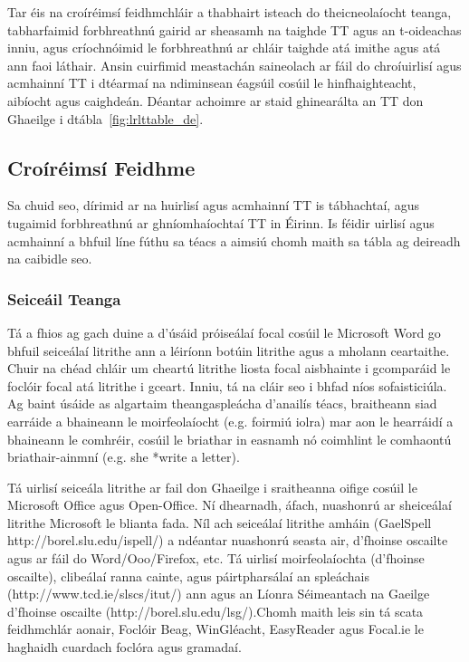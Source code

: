 \begin{multicols}{2}
Tar éis na croíréimsí feidhmchláir a thabhairt isteach do theicneolaíocht teanga, tabharfaimid forbhreathnú gairid ar sheasamh na taighde TT agus an t-oideachas inniu, agus críochnóimid le forbhreathnú ar chláir taighde atá imithe agus atá ann faoi láthair. Ansin cuirfimid meastachán saineolach ar fáil do chroíuirlisí agus acmhainní TT i dtéarmaí na ndiminsean éagsúil cosúil le hinfhaighteacht, aibíocht agus caighdeán. Déantar achoimre ar staid ghinearálta an TT don Ghaeilge i dtábla~\ref{fig:lrlttable_de}.



\subsection{Croíréimsí Feidhme} 

Sa chuid seo, dírimid ar na huirlisí agus acmhainní TT is tábhachtaí, agus tugaimid forbhreathnú ar ghníomhaíochtaí TT in Éirinn. Is féidir uirlisí agus acmhainní a bhfuil líne fúthu sa téacs a aimsiú chomh maith sa tábla ag deireadh na caibidle seo. 

\subsubsection{Seiceáil Teanga}



Tá a fhios ag gach duine a d’úsáid próiseálaí focal cosúil le Microsoft Word go bhfuil seiceálaí litrithe ann a léiríonn botúin litrithe agus a mholann ceartaithe. Chuir na chéad chláir um cheartú litrithe liosta focal aisbhainte i gcomparáid le foclóir focal atá litrithe i gceart. Inniu, tá na cláir seo i bhfad níos sofaisticiúla. Ag baint úsáide as algartaim theangaspleácha d’anailís téacs, braitheann siad earráide a bhaineann le moirfeolaíocht (e.g. foirmiú iolra) mar aon le hearráidí a bhaineann le comhréir, cosúil le briathar in easnamh nó coimhlint le comhaontú briathair-ainmní (e.g. she *write a letter). 

Tá uirlisí seiceála litrithe ar fail don Ghaeilge i sraitheanna oifige cosúil le Microsoft Office agus Open-Office. Ní dhearnadh, áfach, nuashonrú ar sheiceálaí litrithe Microsoft le blianta fada. Níl ach seiceálaí litrithe amháin (GaelSpell http://borel.slu.edu/ispell/) a ndéantar nuashonrú seasta air, d’fhoinse oscailte agus ar fáil do Word/Ooo/Firefox, etc. Tá uirlisí moirfeolaíochta (d’fhoinse oscailte), clibeálaí ranna cainte, agus páirtpharsálaí an spleáchais (http://www.tcd.ie/slscs/itut/) ann  agus an Líonra Séimeantach na Gaeilge d’fhoinse oscailte (http://borel.slu.edu/lsg/).Chomh maith leis sin tá scata feidhmchlár aonair, Foclóir Beag, WinGléacht, EasyReader agus Focal.ie le haghaidh cuardach foclóra agus gramadaí.


\end{multicols}
